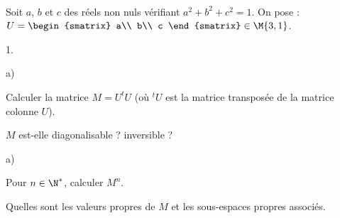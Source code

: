 \documentclass[11pt]{article}%
\begin{document}

\begin{exerciceSP}~\\
  Soit $a$, $b$ et $c$ des réels non nuls vérifiant
  $a^2+b^2+c^2 = 1$. On pose : $U = 
  \begin{smatrix} 
    a\\ 
    b\\
    c
  \end{smatrix} \in \M{3,1}$.
  \begin{noliste}{1.}
    \setlength{\itemsep}{2mm}
  \item 
    \begin{noliste}{a)}
    \setlength{\itemsep}{2mm}
    \item Calculer la matrice $M=U ^t U$ (où $^t U$ est la matrice
      transposée de la matrice colonne $U$).
    \item $M$ est-elle diagonalisable ? inversible ?
    \end{noliste}
  \item
    \begin{noliste}{a)}
    \setlength{\itemsep}{2mm}
    \item Pour $n\in\N^*$, calculer $M^n$.
    \item Quelles sont les valeurs propres de $M$ et les sous-espaces
      propres associés.
    \end{noliste}
  \end{noliste}
\end{exerciceSP}

\end{document}
